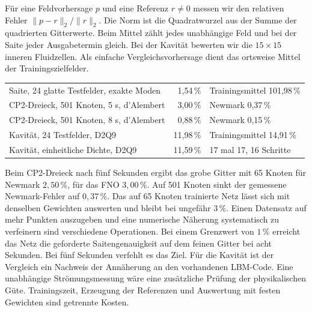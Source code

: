 Für eine Feldvorhersage \(p\) und eine Referenz \(r\ne0\) messen wir den relativen Fehler \(\|p-r\|_2/\|r\|_2\). Die Norm ist die Quadratwurzel aus der Summe der quadrierten Gitterwerte. Beim Mittel zählt jedes unabhängige Feld und bei der Saite jeder Ausgabetermin gleich. Bei der Kavität bewerten wir die \(15\times15\) inneren Fluidzellen. Als einfache Vergleichsvorhersage dient das ortsweise Mittel der Trainingszielfelder.
{\tblstart\begin{tabularx}{\linewidth}{@{}YrP{43mm}@{}}\toprule
{}&&\\\midrule
Saite, 24 glatte Testfelder, exakte Moden&1,54\,\%&Trainingsmittel 101,98\,\%\\
CP2-Dreieck, 501 Knoten, 5 s, d’Alembert&3,00\,\%&Newmark 0,37\,\%\\
CP2-Dreieck, 501 Knoten, 8 s, d’Alembert&0,88\,\%&Newmark 0,15\,\%\\
Kavität, 24 Testfelder, D2Q9&11,98\,\%&Trainingsmittel 14,91\,\%\\
Kavität, einheitliche Dichte, D2Q9&11,59\,\%&17 mal 17, 16 Schritte\\\bottomrule
\end{tabularx}\par}
Beim CP2-Dreieck nach fünf Sekunden ergibt das grobe Gitter mit 65 Knoten für Newmark \(2{,}50\,\%\), für das FNO \(3{,}00\,\%\). Auf 501 Knoten sinkt der gemessene Newmark-Fehler auf \(0{,}37\,\%\). Das auf 65 Knoten trainierte Netz lässt sich mit denselben Gewichten auswerten und bleibt bei ungefähr \(3\,\%\). Einen Datensatz auf mehr Punkten auszugeben und eine numerische Näherung systematisch zu verfeinern sind verschiedene Operationen.
Bei einem Grenzwert von \(1\,\%\) erreicht das Netz die geforderte Saitengenauigkeit auf dem feinen Gitter bei acht Sekunden. Bei fünf Sekunden verfehlt es das Ziel. Für die Kavität ist der Vergleich ein Nachweis der Annäherung an den vorhandenen LBM-Code. Eine unabhängige Strömungsmessung wäre eine zusätzliche Prüfung der physikalischen Güte. Trainingszeit, Erzeugung der Referenzen und Auswertung mit festen Gewichten sind getrennte Kosten.


